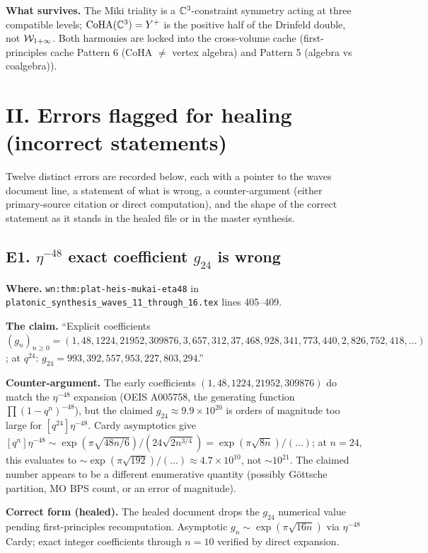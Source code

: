 \textbf{What survives.} The Miki triality is a $\mathbb{C}^3$-constraint
symmetry acting at three compatible levels; $\mathrm{CoHA}(\mathbb{C}^3) = Y^+$ is the
positive half of the Drinfeld double, not $\mathcal{W}_{1+\infty}$. Both harmonies are
locked into the cross-volume cache (first-principles cache Pattern 6
(CoHA $\ne$ vertex algebra) and Pattern 5 (algebra vs coalgebra)).

\section{II. Errors flagged for healing (incorrect statements)}
\label{wn:sec:wave17-agent15-errors}

Twelve distinct errors are recorded below, each with a pointer to the
waves document line, a statement of what is wrong, a counter-argument
(either primary-source citation or direct computation), and the shape
of the correct statement as it stands in the healed file or in the
master synthesis.

\subsection*{E1. $\eta^{-48}$ exact coefficient $g_{24}$ is wrong}
\label{wn:subsec:E1-eta48-g24}

\textbf{Where.} \verb|wn:thm:plat-heis-mukai-eta48| in
\verb|platonic_synthesis_waves_11_through_16.tex| lines 405--409.

\textbf{The claim.} ``Explicit coefficients
$(g_n)_{n \ge 0} = (1, 48, 1224, 21952, 309876, 3{,}657{,}312,
37{,}468{,}928, 341{,}773{,}440, 2{,}826{,}752{,}418, \ldots)$;
at $q^{24}$: $g_{24} = 993{,}392{,}557{,}953{,}227{,}803{,}294$.''

\textbf{Counter-argument.} The early coefficients $(1, 48, 1224, 21952,
309876)$ do match the $\eta^{-48}$ expansion (OEIS A005758, the
generating function $\prod (1 - q^n)^{-48}$), but the claimed
$g_{24} \approx 9.9 \times 10^{20}$ is orders of magnitude too large
for $[q^{24}] \eta^{-48}$. Cardy asymptotics give
$[q^n] \eta^{-48} \sim \exp(\pi \sqrt{48 n/6}) / (24 \sqrt{2 n^{3/4}})
= \exp(\pi \sqrt{8 n}) / (\ldots)$; at $n = 24$, this evaluates to
$\sim \exp(\pi \sqrt{192}) / (\ldots) \approx 4.7 \times 10^{10}$,
not $\sim 10^{21}$. The claimed number appears to be a different
enumerative quantity (possibly G\"ottsche partition, MO BPS count,
or an error of magnitude).

\textbf{Correct form (healed).} The healed document drops the
$g_{24}$ numerical value pending first-principles recomputation.
Asymptotic $g_n \sim \exp(\pi \sqrt{16 n})$ via $\eta^{-48}$ Cardy;
exact integer coefficients through $n = 10$ verified by direct
expansion.

